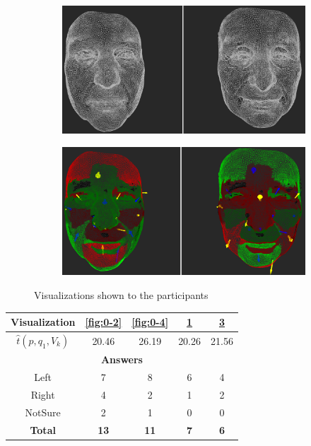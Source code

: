 \begin{figure}[h]
\begin{subfigure}{0.4\textwidth}
\includegraphics[width=\textwidth]{./screenshots/pair1.PNG}
\caption{}
\label{fig:0-1}
\end{subfigure}
\quad
\begin{subfigure}{0.4\textwidth}
\includegraphics[width=\textwidth]{./screenshots/pair3.PNG}
\caption{}
\label{fig:0-3}
\end{subfigure}
\caption{Visualizations shown to the participants}
\end{figure}
\medskip

\begin{center}
\begin{tabular}{| c | c | c | c | c |}
	\hline
	Visualization & \ref{fig:0-2} & \ref{fig:0-4} & \ref{fig:0-1} & \ref{fig:0-3}\\ \hline
	\(\widehat{t}(p, q_1, V_k)\) & 20.46 & 26.19 & 20.26 & 21.56\\ \hline
	\multicolumn{5}{|c|}{\bf Answers} \\ \hline
	Left & 7 & 8 & 6 & 4\\ \hline
	Right & 4 & 2 & 1 & 2\\ \hline
	NotSure & 2 & 1 & 0 & 0\\ \hline
	{\bf Total} & {\bf 13} & {\bf 11} & {\bf 7} & {\bf 6}\\ \hline
\end{tabular}
\end{center}
\clearpage

